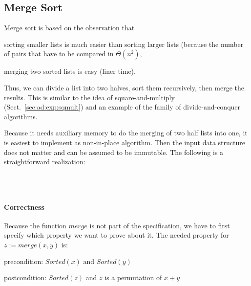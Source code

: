 \subsection{Merge Sort}

Merge sort is based on the observation that
\begin{compactitem}
  \item sorting smaller lists is much easier than sorting larger lists (because the number of pairs that have to be compared in $\Theta(n^2)$,
  \item merging two sorted lists is easy (liner time).
\end{compactitem}
Thus, we can divide a list into two halves, sort them recursively, then merge the results.
This is similar to the idea of square-and-multiply (Sect.~\ref{sec:ad:exp:sqmult}) and an example of the family of divide-and-conquer algorithms.

Because it needs auxiliary memory to do the merging of two half lists into one, it is easiest to implement as non-in-place algorithm.
Then the input data structure does not matter and can be assumed to be immutable.
The following is a straightforward realization:

\begin{acode}
\\
\\
\end{acode}

\paragraph{Correctness}
Because the function $merge$ is not part of the specification, we have to first specify which property we want to prove about it.
The needed property for $z:=merge(x,y)$ is:
 \begin{compactitem}
   \item precondition: $Sorted(x)$ and $Sorted(y)$
   \item postcondition: $Sorted(z)$ and $z$ is a permutation of $x+y$
 \end{compactitem}

